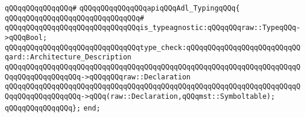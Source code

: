 \verb|qQQqqQQqqQQqqQQq#|\newline
\verb|qQQqqQQqqQQqqQQqapiqQQqAdl_TypingqQQq{|\newline
\verb|qQQqqQQqqQQqqQQqqQQqqQQqqQQqqQQq#|\newline
\verb|qQQqqQQqqQQqqQQqqQQqqQQqqQQqqQQqis_typeagnostic:qQQqqQQqraw::TypeqQQq->qQQqBool;|\newline
\newline
\verb|qQQqqQQqqQQqqQQqqQQqqQQqqQQqqQQqtype_check:qQQqqQQqqQQqqQQqqQQqqQQqqQQqard::Architecture_Description|\newline
\verb|qQQqqQQqqQQqqQQqqQQqqQQqqQQqqQQqqQQqqQQqqQQqqQQqqQQqqQQqqQQqqQQqqQQqqQQqqQQqqQQqqQQqqQQq->qQQqqQQqraw::Declaration|\newline
\verb|qQQqqQQqqQQqqQQqqQQqqQQqqQQqqQQqqQQqqQQqqQQqqQQqqQQqqQQqqQQqqQQqqQQqqQQqqQQqqQQqqQQqqQQq->qQQq(raw::Declaration,qQQqmst::Symboltable);|\newline
\verb|qQQqqQQqqQQqqQQq};|\newline
\verb|end;|\newline

